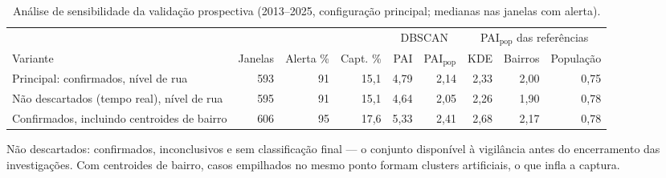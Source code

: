 \begin{table}[htbp]
\centering
\small
\caption{Análise de sensibilidade da validação prospectiva (2013--2025, configuração principal; medianas nas janelas com alerta).}
\label{tab:variantes}
\begin{adjustbox}{max width=\linewidth}
\begin{tabular}{lrrrrrrrr}
\toprule
& & & & \multicolumn{2}{c}{DBSCAN} & \multicolumn{3}{c}{PAI$_\text{pop}$ das referências} \\
\cmidrule(lr){5-6}\cmidrule(lr){7-9}
Variante & Janelas & Alerta \% & Capt. \% & PAI & PAI$_\text{pop}$ & KDE & Bairros & População \\
\midrule
Principal: confirmados, nível de rua & 593 & 91 & 15,1 & 4,79 & 2,14 & 2,33 & 2,00 & 0,75 \\
Não descartados (tempo real), nível de rua & 595 & 91 & 15,1 & 4,64 & 2,05 & 2,26 & 1,90 & 0,78 \\
Confirmados, incluindo centroides de bairro & 606 & 95 & 17,6 & 5,33 & 2,41 & 2,68 & 2,17 & 0,78 \\
\bottomrule
\end{tabular}
\end{adjustbox}
\par\smallskip\begin{minipage}{0.95\linewidth}\footnotesize Não descartados: confirmados, inconclusivos e sem classificação final --- o conjunto disponível à vigilância antes do encerramento das investigações. Com centroides de bairro, casos empilhados no mesmo ponto formam clusters artificiais, o que infla a captura.\end{minipage}
\end{table}
